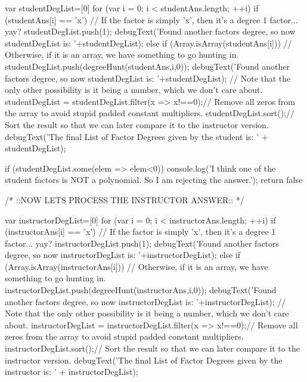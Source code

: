 \documentclass{ximera}
\begin{document}
\begin{javascript}
{    var studentDegList=[0]
    for (var i = 0; i < studentAns.length; ++i) {
        if (studentAns[i] == 'x') {
            // If the factor is simply 'x', then it's a degree 1 factor... yay?
            studentDegList.push(1);
            debugText('Found another factors degree, so now studentDegList is: '+studentDegList);
        } else if (Array.isArray(studentAns[i])) {
            // Otherwise, if it is an array, we have something to go hunting in.
            studentDegList.push(degreeHunt(studentAns,i,0));
            debugText('Found another factors degree, so now studentDegList is: '+studentDegList);
        }// Note that the only other possibility is it being a number, which we don't care about.
    }
    studentDegList = studentDegList.filter(x => x!==0);// Remove all zeros from the array to avoid stupid padded constant multipliers.
    studentDegList.sort();// Sort the result so that we can later compare it to the instructor version.
    debugText('The final List of Factor Degrees given by the student is: ' + studentDegList);
     
    if (studentDegList.some(elem => elem<0)) {
        console.log('I think one of the student factors is NOT a polynomial. So I am rejecting the answer.');
        return false
        }
     
     
    /*
        ::NOW LETS PROCESS THE INSTRUCTOR ANSWER::
    */
     
    var instructorDegList=[0]
    for (var i = 0; i < instructorAns.length; ++i) {
        if (instructorAns[i] == 'x') {
            // If the factor is simply 'x', then it's a degree 1 factor... yay?
            instructorDegList.push(1);
            debugText('Found another factors degree, so now instructorDegList is: '+instructorDegList);
        } else if (Array.isArray(instructorAns[i])) {
            // Otherwise, if it is an array, we have something to go hunting in.
            instructorDegList.push(degreeHunt(instructorAns,i,0));
            debugText('Found another factors degree, so now instructorDegList is: '+instructorDegList);
        }// Note that the only other possibility is it being a number, which we don't care about.
    }
    instructorDegList = instructorDegList.filter(x => x!==0);// Remove all zeros from the array to avoid stupid padded constant multipliers.
    instructorDegList.sort();// Sort the result so that we can later compare it to the instructor version.
    debugText('The final List of Factor Degrees given by the instructor is: ' + instructorDegList);
     
}
\end{javascript}
\end{document}
